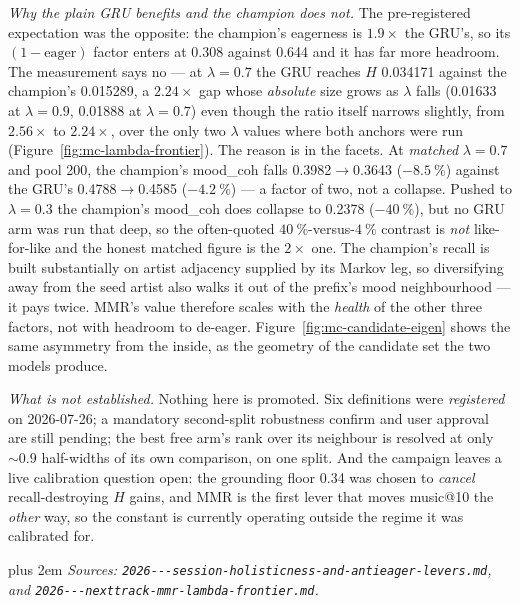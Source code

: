 \documentclass[11pt]{article}
\begin{document}
\emph{Why the plain GRU benefits and the champion does not.} The pre-registered
expectation was the opposite: the champion's eagerness is $1.9\times$ the GRU's,
so its $(1-\text{eager})$ factor enters at \num{0.308} against \num{0.644} and
it has far more headroom. The measurement says no --- at $\lambda=\num{0.7}$ the
GRU reaches $H$ \num{0.034171} against the champion's \num{0.015289}, a
$2.24\times$ gap whose \emph{absolute} size grows as $\lambda$ falls
(\num{0.01633} at $\lambda=\num{0.9}$, \num{0.01888} at $\lambda=\num{0.7}$)
even though the ratio itself narrows slightly, from $2.56\times$ to $2.24\times$,
over the only two $\lambda$ values where both anchors were run
(Figure~\ref{fig:mc-lambda-frontier}). The reason is in the facets. At
\emph{matched} $\lambda=\num{0.7}$ and pool \num{200}, the champion's mood\_coh
falls \num{0.3982}$\to$\num{0.3643} ($-\SI{8.5}{\percent}$) against the GRU's
\num{0.4788}$\to$\num{0.4585} ($-\SI{4.2}{\percent}$) --- a factor of two, not a
collapse. Pushed to $\lambda=\num{0.3}$ the champion's mood\_coh does collapse to
\num{0.2378} ($-\SI{40}{\percent}$), but no GRU arm was run that deep, so the
often-quoted $\SI{40}{\percent}$-versus-$\SI{4}{\percent}$ contrast is
\emph{not} like-for-like and the honest matched figure is the $2\times$ one.
The champion's recall is built substantially on artist
adjacency supplied by its Markov leg, so diversifying away from the seed artist
also walks it out of the prefix's mood neighbourhood --- it pays twice. MMR's
value therefore scales with the \emph{health} of the other three factors, not
with headroom to de-eager. Figure~\ref{fig:mc-candidate-eigen} shows the same
asymmetry from the inside, as the geometry of the candidate set the two models
produce.

\emph{What is not established.} Nothing here is promoted. Six definitions were
\emph{registered} on 2026-07-26; a mandatory second-split robustness confirm and
user approval are still pending; the best free arm's rank over its neighbour is
resolved at only ${\sim}\num{0.9}$ half-widths of its own comparison, on one
split. And the campaign leaves a live calibration question open: the grounding
floor \num{0.34} was chosen to \emph{cancel} recall-destroying $H$ gains, and
MMR is the first lever that moves music@10 the \emph{other} way, so the constant
is currently operating outside the regime it was calibrated for.

{\rightskip=0pt plus 2em \emph{Sources: \texttt{2026---\allowbreak session-\allowbreak holisticness-\allowbreak and-\allowbreak antieager-\allowbreak levers.md},
and \texttt{2026---\allowbreak nexttrack-\allowbreak mmr-\allowbreak lambda-\allowbreak frontier.md}.}\par}
\end{document}
